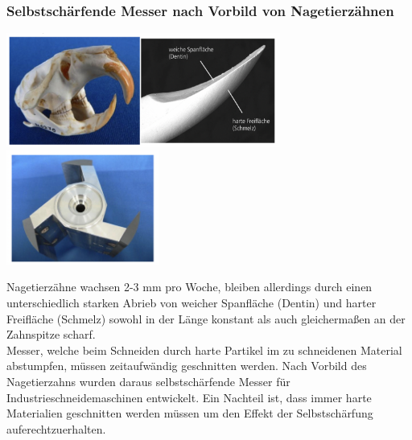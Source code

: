 \subsubsection{Selbstschärfende Messer nach Vorbild von Nagetierzähnen}

\begin{center}
    \includegraphics[width=9cm]{lec5/figures/zahn.png}
    \includegraphics[width=5cm]{lec5/figures/messer.png}
\end{center}
Nagetierzähne wachsen 2-3 mm pro Woche, bleiben allerdings durch einen unterschiedlich starken Abrieb von weicher Spanfläche (Dentin) und harter Freifläche (Schmelz) sowohl in der Länge konstant als auch gleichermaßen an der Zahnspitze scharf. \\

Messer, welche beim Schneiden durch harte Partikel im zu schneidenen Material abstumpfen, müssen zeitaufwändig geschnitten werden. Nach Vorbild des Nagetierzahns wurden daraus selbstschärfende Messer für Industrieschneidemaschinen entwickelt. Ein Nachteil ist, dass immer harte Materialien geschnitten werden müssen um den Effekt der Selbstschärfung auferechtzuerhalten.